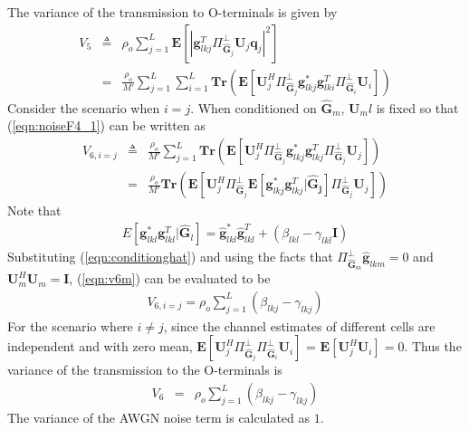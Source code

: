 \documentclass[10pt, a4paper, twoside,fleqn]{article}
\begin{document}
The variance of the transmission to O-terminals is given by
\begin{eqnarray}\label{eqn:noiseF4_1}
	V_5 &\triangleq& \rho_o\sum_{j=1}^{L}\pmb{E}\left[|\pmb{g}_{lkj}^T\Pi^{\perp}_{{\widehat{\pmb{G}}_j}}\pmb{U}_j \pmb{q}_{j}|^2\right] \nonumber \\
            &=&       \frac{\rho_o}{M'}\sum_{j=1}^{L}\sum_{i=1}^{L} \pmb{Tr}\left(\pmb{E}\left[\pmb{U}_j^H \Pi^{\perp}_{\pmb{\widehat{G}}_j} \pmb{g}_{lkj}^* \pmb{g}_{lki}^{T}\Pi^{\perp}_{\pmb{\hat G}_i} \pmb{U}_i \right]\right)
\end{eqnarray}
Consider the scenario when $i=j$. When conditioned on $\pmb{\hat G}_m$, $\pmb{U}_ml$ is fixed so that
(\ref{eqn:noiseF4_1}) can be written as 
\begin{eqnarray}\label{eqn:v6m}
V_{6,i=j}&\triangleq& \frac{\rho_o}{M'}\sum_{j=1}^{L} \pmb{Tr}\left(\pmb{E}\left[\pmb{U}_j^H \Pi^{\perp}_{\pmb{\widehat{G}}_j} \pmb{g}_{lkj}^* \pmb{g}_{lkj}^{T}\Pi^{\perp}_{\pmb{\hat G}_j} \pmb{U}_j \right]\right) \nonumber \\
           &=& \frac{\rho_o}{M'}\pmb{Tr}\left(\pmb{E}\left[\pmb{U}_j^H \Pi^{\perp}_{\pmb{\widehat{G}}_j} \pmb{E}[\pmb{g}_{lkj}^* \pmb{g}_{lkj}^{T} | \pmb{\hat G_j}]\Pi^{\perp}_{\pmb{\hat G}_j} \pmb{U}_j \right]\right)
\end{eqnarray}
Note that 
\begin{eqnarray}\label{eqn:conditionghat}
E[\pmb{g}_{lkl}^*\pmb{g}_{lkl}^T|\pmb{\hat G}_l] = \pmb{\hat g}_{lkl}^*\pmb{\hat g}_{lkl}^T + (\beta_{lkl}-\gamma_{lkl}\pmb{I})
\end{eqnarray}
Substituting (\ref{eqn:conditionghat}) and using the facts that $\Pi^{\perp}_{\pmb{\hat G}_m}\pmb{\hat g}_{lkm} = 0$ and $\pmb{U}_m^H\pmb{U}_m=\pmb{I}$, (\ref{eqn:v6m}) can be evaluated to be
\begin{eqnarray}\label{eqn:v6l}
V_{6,i=j}= \rho_o\sum\limits_{j=1}^{L}(\beta_{lkj} -\gamma_{lkj})
\end{eqnarray}
For the scenario where $i\neq j$, since the channel estimates of different cells are independent and with zero mean, $\pmb{E}\left[\pmb{U}_j^H\Pi^{\perp}_{\pmb{\widehat{G}}_j}\Pi^{\perp}_{\pmb{\widehat{G}}_i} \pmb{U}_i\right]$ = $\pmb{E}[\pmb{U}_j^H\pmb{U}_i] =0$. Thus the variance of the transmission to the O-terminals is
\begin{eqnarray}\label{eqn:v6}
   V_6 &=& \rho_o\sum\limits_{j=1}^{L}(\beta_{lkj} -\gamma_{lkj})
\end{eqnarray}
The variance of the AWGN noise term is calculated as $1$.
\end{document}
